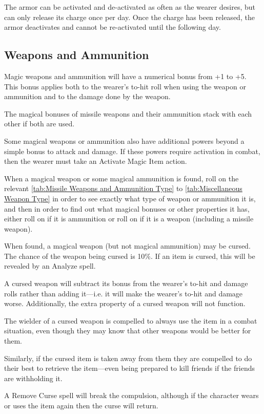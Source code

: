 \begin{multicols*}{2}
The armor can be activated and de-activated as often as the wearer desires, but can only release its charge once per day. Once the charge has been released, the armor deactivates and cannot be re-activated until the following day.

\subsection{Weapons and Ammunition}
Magic weapons and ammunition will have a numerical bonus from +1 to +5. This bonus applies both to the wearer’s to-hit roll when using the weapon or ammunition and to the damage done by the weapon.

The magical bonuses of missile weapons and their ammunition stack with each other if both are used.

Some magical weapons or ammunition also have additional powers beyond a simple bonus to attack and damage. If these powers require activation in combat, then the wearer must take an Activate Magic Item action.

When a magical weapon or some magical ammunition is found, roll on the relevant \autoref*{tab:Missile Weapons and Ammunition Type} to \autoref*{tab:Miscellaneous Weapon Type} in order to see exactly what type of weapon or ammunition it is, and then in order to find out what magical bonuses or other properties it has, either roll on  if it is ammunition or roll on  if it is a weapon (including a missile weapon).

When found, a magical weapon (but not magical ammunition) may be cursed. The chance of the weapon being cursed is 10\%. If an item is cursed, this will be revealed by an Analyze spell.

A cursed weapon will subtract its bonus from the wearer’s to-hit and damage rolls rather than adding it—i.e. it will make the wearer’s to-hit and damage worse. Additionally, the extra property of a cursed weapon will not function.

The wielder of a cursed weapon is compelled to always use the item in a combat situation, even though they may know that other weapons would be better for them.

Similarly, if the cursed item is taken away from them they are compelled to do their best to retrieve the item—even being prepared to kill friends if the friends are withholding it.

A Remove Curse spell will break the compulsion, although if the character wears or uses the item again then the curse will return.


\end{multicols*}
